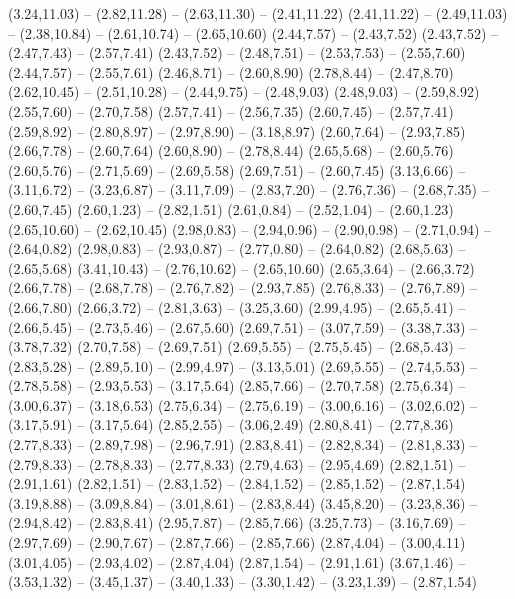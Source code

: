 {  (3.24,11.03) -- (2.82,11.28) -- (2.63,11.30) -- (2.41,11.22)
  (2.41,11.22) -- (2.49,11.03) -- (2.38,10.84) -- (2.61,10.74) -- (2.65,10.60)
  (2.44,7.57) -- (2.43,7.52)
  (2.43,7.52) -- (2.47,7.43) -- (2.57,7.41)
  (2.43,7.52) -- (2.48,7.51) -- (2.53,7.53) -- (2.55,7.60)
  (2.44,7.57) -- (2.55,7.61)
  (2.46,8.71) -- (2.60,8.90)
  (2.78,8.44) -- (2.47,8.70)
  (2.62,10.45) -- (2.51,10.28) -- (2.44,9.75) -- (2.48,9.03)
  (2.48,9.03) -- (2.59,8.92)
  (2.55,7.60) -- (2.70,7.58)
  (2.57,7.41) -- (2.56,7.35)
  (2.60,7.45) -- (2.57,7.41)
  (2.59,8.92) -- (2.80,8.97) -- (2.97,8.90) -- (3.18,8.97)
  (2.60,7.64) -- (2.93,7.85)
  (2.66,7.78) -- (2.60,7.64)
  (2.60,8.90) -- (2.78,8.44)
  (2.65,5.68) -- (2.60,5.76)
  (2.60,5.76) -- (2.71,5.69) -- (2.69,5.58)
  (2.69,7.51) -- (2.60,7.45)
  (3.13,6.66) -- (3.11,6.72) -- (3.23,6.87) -- (3.11,7.09) -- (2.83,7.20) -- (2.76,7.36) -- (2.68,7.35) -- (2.60,7.45)
  (2.60,1.23) -- (2.82,1.51)
  (2.61,0.84) -- (2.52,1.04) -- (2.60,1.23)
  (2.65,10.60) -- (2.62,10.45)
  (2.98,0.83) -- (2.94,0.96) -- (2.90,0.98) -- (2.71,0.94) -- (2.64,0.82)
  (2.98,0.83) -- (2.93,0.87) -- (2.77,0.80) -- (2.64,0.82)
  (2.68,5.63) -- (2.65,5.68)
  (3.41,10.43) -- (2.76,10.62) -- (2.65,10.60)
  (2.65,3.64) -- (2.66,3.72)
  (2.66,7.78) -- (2.68,7.78) -- (2.76,7.82) -- (2.93,7.85)
  (2.76,8.33) -- (2.76,7.89) -- (2.66,7.80)
  (2.66,3.72) -- (2.81,3.63) -- (3.25,3.60)
  (2.99,4.95) -- (2.65,5.41) -- (2.66,5.45) -- (2.73,5.46) -- (2.67,5.60)
  (2.69,7.51) -- (3.07,7.59) -- (3.38,7.33) -- (3.78,7.32)
  (2.70,7.58) -- (2.69,7.51)
  (2.69,5.55) -- (2.75,5.45) -- (2.68,5.43) -- (2.83,5.28) -- (2.89,5.10) -- (2.99,4.97) -- (3.13,5.01)
  (2.69,5.55) -- (2.74,5.53) -- (2.78,5.58) -- (2.93,5.53) -- (3.17,5.64)
  (2.85,7.66) -- (2.70,7.58)
  (2.75,6.34) -- (3.00,6.37) -- (3.18,6.53)
  (2.75,6.34) -- (2.75,6.19) -- (3.00,6.16) -- (3.02,6.02) -- (3.17,5.91) -- (3.17,5.64)
  (2.85,2.55) -- (3.06,2.49)
  (2.80,8.41) -- (2.77,8.36)
  (2.77,8.33) -- (2.89,7.98) -- (2.96,7.91)
  (2.83,8.41) -- (2.82,8.34) -- (2.81,8.33) -- (2.79,8.33) -- (2.78,8.33) -- (2.77,8.33)
  (2.79,4.63) -- (2.95,4.69)
  (2.82,1.51) -- (2.91,1.61)
  (2.82,1.51) -- (2.83,1.52) -- (2.84,1.52) -- (2.85,1.52) -- (2.87,1.54)
  (3.19,8.88) -- (3.09,8.84) -- (3.01,8.61) -- (2.83,8.44)
  (3.45,8.20) -- (3.23,8.36) -- (2.94,8.42) -- (2.83,8.41)
  (2.95,7.87) -- (2.85,7.66)
  (3.25,7.73) -- (3.16,7.69) -- (2.97,7.69) -- (2.90,7.67) -- (2.87,7.66) -- (2.85,7.66)
  (2.87,4.04) -- (3.00,4.11)
  (3.01,4.05) -- (2.93,4.02) -- (2.87,4.04)
  (2.87,1.54) -- (2.91,1.61)
  (3.67,1.46) -- (3.53,1.32) -- (3.45,1.37) -- (3.40,1.33) -- (3.30,1.42) -- (3.23,1.39) -- (2.87,1.54)
}
